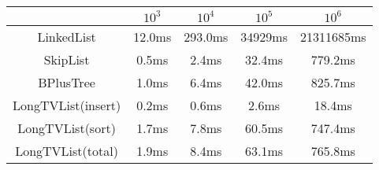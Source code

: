 \documentclass[UTF8]{article}
\begin{document}
\begin{tabular}{|c|c|c|c|c|}

    \hline
     & $10^3$ & $10^4$ & $10^5$ & $10^6$ \\
    \hline
    LinkedList & 12.0ms & 293.0ms & 34929ms & 21311685ms\\
    \hline
    SkipList & 0.5ms & 2.4ms & 32.4ms & 779.2ms\\
    \hline
    BPlusTree & 1.0ms & 6.4ms & 42.0ms & 825.7ms\\
    \hline
    LongTVList(insert) & 0.2ms & 0.6ms & 2.6ms & 18.4ms\\
    \hline
    LongTVList(sort) & 1.7ms & 7.8ms & 60.5ms & 747.4ms\\
    \hline
    LongTVList(total) & 1.9ms & 8.4ms & 63.1ms & 765.8ms\\
    \hline

\end{tabular}
\end{document}
